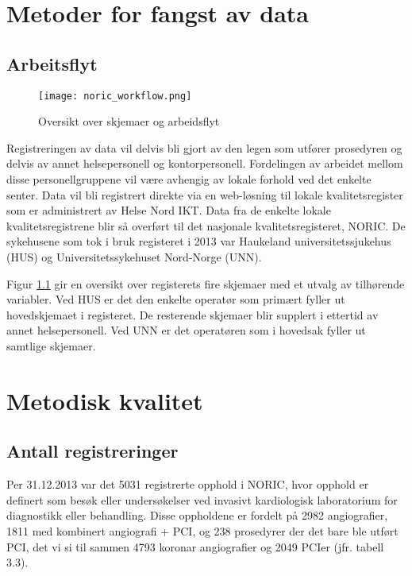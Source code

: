 \documentclass[norsk, a4paper]{report}
\begin{document}
\clearpage
\chapter{Metoder for fangst av data}\label{cha:metoder}

\section{Arbeitsflyt}
\begin{figure}
  \label{fig:workflow}
  \texttt{[image: noric\_workflow.png]}
  \caption{Oversikt over skjemaer og arbeidsflyt}
\end{figure}

Registreringen av data vil delvis bli gjort av den legen som utfører prosedyren og delvis av annet helsepersonell og kontorpersonell. Fordelingen av arbeidet mellom disse personellgruppene vil være avhengig av lokale forhold ved det enkelte senter. Data vil bli registrert direkte via en web-løsning til lokale kvalitetsregister som er administrert av Helse Nord IKT. Data fra de enkelte lokale kvalitetsregistrene blir så overført til det nasjonale kvalitetsregisteret, NORIC. De sykehusene som tok i bruk registeret i 2013 var Haukeland universitetssjukehus (HUS) og Universitetssykehuset Nord-Norge (UNN).

Figur \ref{fig:workflow} gir en oversikt over registerets fire skjemaer med et utvalg av tilhørende variabler. Ved HUS er det den enkelte operatør som primært fyller ut hovedskjemaet i registeret. De resterende skjemaer blir supplert i ettertid av annet helsepersonell. Ved UNN er det operatøren som i hovedsak fyller ut samtlige skjemaer. 



\chapter{Metodisk kvalitet}\label{cha:kva}

\section{Antall registreringer}\label{sec:reg}
Per 31.12.2013 var det 5031 registrerte opphold i NORIC, hvor opphold er definert som besøk eller undersøkelser ved invasivt kardiologisk laboratorium for diagnostikk eller behandling. Disse oppholdene er fordelt på 2982 angiografier, 1811 med kombinert angiografi + PCI, og 238 prosedyrer der det bare ble utført PCI, det vi si til sammen 4793 koronar angiografier og 2049 PCIer (jfr. tabell 3.3).  
\end{document}
